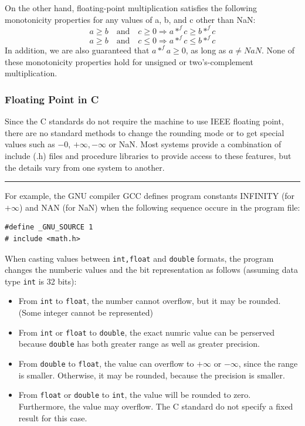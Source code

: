 \documentclass[11pt]{article}
\begin{document}
On the other hand, floating-point multiplication satisfies the following monotonicity properties for any values of a, b, and c other than NaN:\\
\begin{equation}
a \ge b \quad \mathrm{and} \quad c \ge 0 \Rightarrow a*^f c \ge b *^f c
\end{equation}
\begin{equation}
a \ge b \quad \mathrm{and} \quad c \le 0 \Rightarrow a*^f c \le b *^f c
\end{equation}
In addition, we are also guaranteed that \(a *^f a \ge 0\), as long as \(a \ne NaN\). None of these monotonicity properties hold for unsigned or two's-complement multiplication.\\




\subsubsection{Floating Point in C}
\label{sec:org19c7602}
Since the C standards do not require the machine to use IEEE floating point, there are no standard methods to change the rounding mode or to get special values such as −0, \(+\infty, -\infty\) or NaN. Most systems provide a combination of include (.h) files and procedure libraries to provide access to these features, but the details vary from one system to another.\\

\noindent\rule{\textwidth}{0.5pt}
For example, the GNU compiler GCC defines program constants INFINITY (for \(+\infty\)) and NAN (for NaN) when the following sequence occure in the program file:\\
\begin{verbatim}
#define _GNU_SOURCE 1
# include <math.h>
\end{verbatim}


When casting values between \texttt{int,float} and \texttt{double} formats, the program changes the numberic values and the bit representation as follows (assuming data type \texttt{int} is 32 bits):\\
\begin{itemize}
\item From \texttt{int} to \texttt{float}, the number cannot overflow, but it may be rounded. (Some integer cannot be represented)\\
\item From \texttt{int} or \texttt{float} to \texttt{double}, the exact numric value can be perserved because \texttt{double} has both greater range as well as greater precision.\\
\item From \texttt{double} to \texttt{float}, the value can overflow to \(+\infty\) or \(-\infty\), since the range is smaller. Otherwise, it may be rounded, because the precision is smaller.\\
\item From \texttt{float} or \texttt{double} to \texttt{int}, the value will be rounded to zero. Furthermore, the value may overflow. The C standard do not specify a fixed result for this case.\\
\end{itemize}
\end{document}
